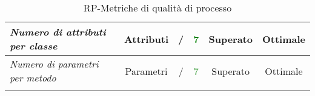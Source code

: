 \begin{longtable}{|>{\centering}m{5cm}|c|c|c|c|c|}
\emph{Numero di attributi per classe} & {Attributi} & / &\textcolor{Green}{7} & Superato & Ottimale\\ \hline
\emph{Numero di parametri per metodo} & {Parametri} & / &\textcolor{Green}{7} & Superato & Ottimale\\ \hline
\caption{RP-Metriche di qualità di processo}
\end{longtable}

